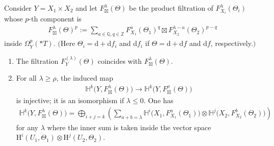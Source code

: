 \documentclass[pdftex]{sigma}
\newcommand{\HH}{\mathbb{H}}
\newcommand{\QQ}{\mathbb{Q}}
\newcommand{\de}{\mathrm{d}}
\newcommand{\coH}{\mathrm{H}}
\newcommand{\ddRH}{\Theta}
\begin{document}
\begin{lemma*} Consider $Y = X_1\times X_2$ and let $F_\boxtimes^\lambda(\ddRH)$ be the product filtration of $F_{X_i}^\lambda(\ddRH_i)$ whose $p$-th component is
\begin{gather*} F_\boxtimes^\lambda(\ddRH)^p := \sum_{a\in\QQ, q\in\mathbb{Z}} 	F_{X_1}^a(\ddRH_1)^q \boxtimes F_{X_2}^{\lambda-a}(\ddRH_2)^{p-q} \end{gather*}
inside $\Omega_Y^p(*T)$. $($Here $\ddRH_i = \de+\de f_i$ and $\de f_i$ if $\ddRH = \de+\de f$ and $\de f$, respectively.$)$
\begin{enumerate}\itemsep=0pt
\item The filtration $F_Y^{(\lambda)}(\ddRH)$ coincides with $F_\boxtimes^\lambda(\ddRH)$.
\item For all $\lambda \geq \rho$, the induced map
\begin{gather*} \HH^k\big(Y,F_\boxtimes^\lambda(\ddRH)\big) \to \HH^k\big(Y,F_\boxtimes^\rho(\ddRH)\big) \end{gather*}
is injective; it is an isomorphism if $\lambda\leq 0$. One has
\begin{gather}\label{eq:Kunneth-Y1}
\HH^k\big(Y, F_\boxtimes^\lambda(\ddRH)\big) = \bigoplus_{i+j=k}\left(\sum_{a +b = \lambda} \HH^i\big(X_1,F_{X_1}^a(\ddRH_1)\big)\otimes\HH^j\big(X_2,F^b_{X_2}(\ddRH_2)\big) \right)
\end{gather}
for any $\lambda$ where the inner sum is taken inside the vector space $\coH^i(U_1,\ddRH_1)\otimes \coH^j(U_2,\ddRH_2)$.
\end{enumerate}
\end{lemma*}
\end{document}
